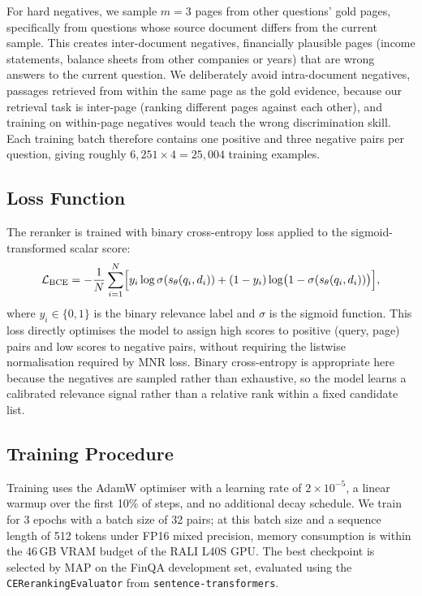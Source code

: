 \documentclass[12pt,twoside,maitrise]{dms}
\newcounter{example}
\theoremstyle{definition}
\numberwithin{equation}{section}
\numberwithin{table}{chapter}
\numberwithin{figure}{chapter}
\begin{document}
For hard negatives, we sample $m=3$ pages from other questions' gold pages,
specifically from questions whose source document differs from the current sample.  This
creates inter-document negatives, financially plausible pages (income statements, balance
sheets from other companies or years) that are wrong answers to the current question.  We
deliberately avoid intra-document negatives, passages retrieved from within the same
page as the gold evidence, because our retrieval task is inter-page (ranking different
pages against each other), and training on within-page negatives would teach the wrong
discrimination skill.  Each training batch therefore contains one positive and three
negative pairs per question, giving roughly $6{,}251 \times 4 = 25{,}004$ training
examples.

\subsection{Loss Function}

The reranker is trained with binary cross-entropy loss applied to the sigmoid-transformed
scalar score:
\begin{equation}
  \mathcal{L}_{\text{BCE}} = -\frac{1}{N}\sum_{i=1}^{N}
  \Bigl[y_i \log \sigma(s_\theta(q_i, d_i))
       + (1 - y_i) \log \bigl(1 - \sigma(s_\theta(q_i, d_i))\bigr)\Bigr],
  \label{eq:bce}
\end{equation}
where $y_i \in \{0, 1\}$ is the binary relevance label and $\sigma$ is the sigmoid
function.  This loss directly optimises the model to assign high scores to positive
(query, page) pairs and low scores to negative pairs, without requiring the
listwise normalisation required by MNR loss.  Binary cross-entropy is appropriate here
because the negatives are sampled rather than exhaustive, so the model learns a calibrated
relevance signal rather than a relative rank within a fixed candidate list.

\subsection{Training Procedure}

Training uses the AdamW optimiser with a learning rate of $2 \times 10^{-5}$, a linear
warmup over the first 10\% of steps, and no additional decay schedule.  We train for
3 epochs with a batch size of 32 pairs; at this batch size and a sequence length of
512 tokens under FP16 mixed precision, memory consumption is within the 46\,GB VRAM
budget of the RALI L40S GPU.  The best checkpoint is selected by MAP on the FinQA
development set, evaluated using the \texttt{CERerankingEvaluator} from
\texttt{sentence-transformers}. 
\end{document}
